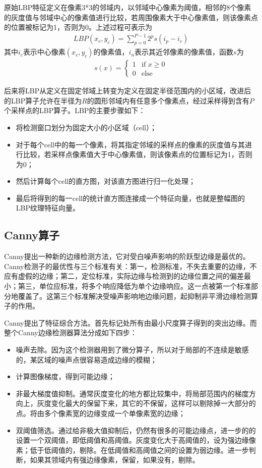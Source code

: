 \documentclass[supercite]{HustGraduPaper}
\begin{document}
\begin{sloppypar}
\begin{appendices}
    原始LBP特征定义在像素3*3的邻域内，以邻域中心像素为阈值，相邻的8个像素的灰度值与邻域中心的像素值进行比较，若周围像素大于中心像素值，则该像素点的位置被标记为1，否则为0。上述过程可表示为\begin{gather}
     LBP(x_c,y_c)=\sum\limits_{p=0}^{P-1}2^{p}s(i_p-i_c)
    \end{gather}
    其中$i_c$表示中心像素$(x_c,y_c)$的像素值，$i_n$表示其近邻像素的像素值，函数$s$为\begin{gather}
      s(x)=\left\{
       \begin{array}{ll}
         1&\text{if  }x\geq0\\
         0&\text{else}
       \end{array}
      \right.
    \end{gather}

    后来将LBP从定义在固定邻域上转变为定义在固定半径范围内的小区域，改进后的LBP算子允许在半径为$R$的圆形邻域内有任意多个像素点，经过采样得到含有$P$个采样点的LBP算子。LBP的主要步骤如下：\begin{itemize}
    \item  将检测窗口划分为固定大小的小区域（cell）；
    \item 对于每个cell中的每一个像素，将其指定邻域的采样点的像素的灰度值与其进行比较，若采样点像素值大于中心像素值，则该像素点的位置标记为1，否则为0；
    \item 然后计算每个cell的直方图，对该直方图进行归一化处理；
    \item 最后将得到的每一cell的统计直方图连接成一个特征向量，也就是整幅图的LBP纹理特征向量。
    \end{itemize}
    \subsection{Canny算子}
    Canny提出一种新的边缘检测方法，它对受白噪声影响的阶跃型边缘是最优的。Canny检测子的最优性与三个标准有关：第一，检测标准，不失去重要的边缘，不应有虚假的边缘；第二，定位标准，实际边缘与检测到的边缘位置之间的偏差最小；第三，单位应标准，将多个响应降低为单个边缘响应。这一点被第一个标准部分地覆盖了。这第三个标准解决受噪声影响地边缘问题，起抑制非平滑边缘检测算子的作用。

    Canny提出了特征综合方法。首先标记处所有由最小尺度算子得到的突出边缘。而整个Canny边缘检测器算法分成如下四步：\begin{itemize}
      \item  噪声去除。因为这个检测器用到了微分算子，所以对于局部的不连续是敏感的，某区域的噪声点很容易造成边缘的模糊；
      \item 计算图像梯度，得到可能边缘；
      \item 非最大梯度值抑制。通常灰度变化的地方都比较集中，将局部范围内的梯度方向上，灰度变化最大的保留下来，其它的不保留，这样可以剔除掉一大部分的点。将由多个像素宽的边缘变成一个单像素宽的边缘；
      \item 双阈值筛选。通过给非极大值抑制后，仍然有很多的可能边缘点，进一步的的设置一个双阈值，即低阈值和高阈值。灰度变化大于高阈值的，设为强边缘像素；低于低阈值的，剔除。在低阈值和高阈值之间的设置为弱边缘。进一步判断，如果其领域内有强边缘像素，保留，如果没有，剔除。
    \end{itemize}

\end{appendices}
\end{sloppypar}
\end{document}
